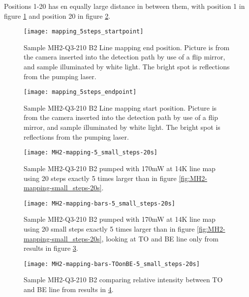 Positions 1-20 has en equally large distance in between them, with position 1 in figure \ref{fig:mapping_5steps_startpoint} and position 20 in figure \ref{fig:mapping_5steps_endpoint}.

\begin{figure}[H]
\centering
\texttt{[image: mapping\_5steps\_startpoint]}
\caption[MH2-Q3-210 line mapping start position]{Sample MH2-Q3-210 B2 Line mapping end position. Picture is from the camera inserted into the detection path by use of a flip mirror, and sample illuminated by white light. The bright spot is reflections from the pumping laser.}
\label{fig:mapping_5steps_startpoint}%
\end{figure}


\begin{figure}[H]
\centering
\texttt{[image: mapping\_5steps\_endpoint]}
\caption[MH2-Q3-210 line mapping start position]{Sample MH2-Q3-210 B2 Line mapping start position. Picture is from the camera inserted into the detection path by use of a flip mirror, and sample illuminated by white light. The bright spot is reflections from the pumping laser.}
\label{fig:mapping_5steps_endpoint}%
\end{figure}

\begin{figure}[H]
\centering
\texttt{[image: MH2-mapping-5\_small\_steps-20s]}
\caption[MH2-Q3-210 line mapping]{Sample MH2-Q3-210 B2 pumped with 170mW at 14K line map using 20 steps exactly 5 times larger than in figure \ref{fig:MH2-mapping-small_steps-20s}.}
\label{fig:MH2-mapping-5_small_steps-20s}%
\end{figure}


\begin{figure}[H]
\centering
\texttt{[image: MH2-mapping-bars-5\_small\_steps-20s]}
\caption[MH2-Q3-210 line mapping]{Sample MH2-Q3-210 B2 pumped with 170mW at 14K line map using 20 small steps exactly 5 times larger than in figure \ref{fig:MH2-mapping-small_steps-20s}, looking at TO and BE line only from results in figure \ref{fig:MH2-mapping-5_small_steps-20s}.}
\label{fig:MH2-mapping-bars-5_small_steps-20s}%
\end{figure}


\begin{figure}[H]
\centering
\texttt{[image: MH2-mapping-bars-TOonBE-5\_small\_steps-20s]}
\caption[MH2-Q3-210 line mapping]{Sample MH2-Q3-210 B2 comparing relative intensity between TO and BE line from results in \ref{fig:MH2-mapping-bars-5_small_steps-20s}.}
\label{fig:MH2-mapping-bars-TOonBE-5_small_steps-20s}%
\end{figure}